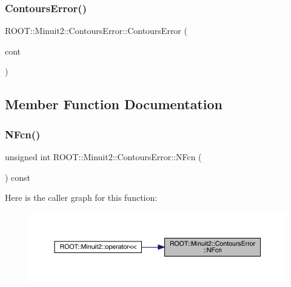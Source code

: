 \subsubsection{\texorpdfstring{ContoursError()}{ContoursError()}\hspace{0.1cm}{\footnotesize\ttfamily [6/6]}}
{\footnotesize\ttfamily R\+O\+O\+T\+::\+Minuit2\+::\+Contours\+Error\+::\+Contours\+Error (\begin{DoxyParamCaption}\item[{const \mbox{\hyperlink{classROOT_1_1Minuit2_1_1ContoursError}{Contours\+Error}} \&}]{cont }\end{DoxyParamCaption})\hspace{0.3cm}{\ttfamily [inline]}}



\subsection{Member Function Documentation}
\mbox{\label{classROOT_1_1Minuit2_1_1ContoursError_a1342abcb15690e6897ad860e7f05026d}} 
\subsubsection{\texorpdfstring{NFcn()}{NFcn()}\hspace{0.1cm}{\footnotesize\ttfamily [1/3]}}
{\footnotesize\ttfamily unsigned int R\+O\+O\+T\+::\+Minuit2\+::\+Contours\+Error\+::\+N\+Fcn (\begin{DoxyParamCaption}{ }\end{DoxyParamCaption}) const\hspace{0.3cm}{\ttfamily [inline]}}

Here is the caller graph for this function\+:
\nopagebreak
\begin{figure}[H]
\begin{center}
\leavevmode
\includegraphics[width=350pt]{d3/de9/classROOT_1_1Minuit2_1_1ContoursError_a1342abcb15690e6897ad860e7f05026d_icgraph}
\end{center}
\end{figure}
\mbox{\label{classROOT_1_1Minuit2_1_1ContoursError_a1342abcb15690e6897ad860e7f05026d}} 
